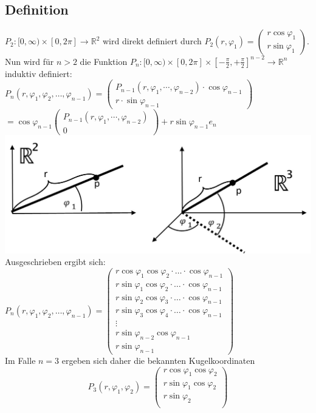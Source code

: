 \documentclass[a4paper,11pt]{scrartcl}
\newcommand{\R}{{\ensuremath{\mathbb{R}}}}
\begin{document}
\subsection{Definition}
$P_2:[0, \infty)\times [0, 2\pi]\to \R^2$ wird direkt definiert durch $P_2(r,\varphi_1)=\begin{pmatrix}
r\cos\varphi_1\\ r\sin\varphi_1\end{pmatrix}$.\\
Nun wird für $n>2$ die Funktion $P_n:[0,\infty)\times[0, 2\pi]\times[-\frac{\pi}{2},+\frac{\pi}{2}]^{n-2}\to \R^n$ induktiv definiert:\\[0.5em]
$P_n(r,\varphi_1, \varphi_2, \ldots, \varphi_{n-1})=\begin{pmatrix}
P_{n-1}(r,\varphi_1,\cdots,\varphi_{n-2})\cdot\cos\varphi_{n-1} \\ r\cdot\sin \varphi_{n-1}\end{pmatrix}
$ \\ $= \cos\varphi_{n-1}\begin{pmatrix}P_{n-1}(r,\varphi_1,\cdots,\varphi_{n-2}) \\ 0 \end{pmatrix}+r\sin\varphi_{n-1}e_n$\\
\includegraphics[scale=0.5]{images/PolarKugelkoordinaten.jpg}\\
Ausgeschrieben ergibt sich:\\
$P_n(r,\varphi_1, \varphi_2, \ldots, \varphi_{n-1})= \begin{pmatrix}r\cos\varphi_1\cos\varphi_2\cdot\ldots\cdot\cos\varphi_{n-1} \\ r\sin\varphi_1\cos\varphi_2\cdot\ldots\cdot\cos\varphi_{n-1} \\
r\sin\varphi_2\cos\varphi_3\cdot\ldots\cdot\cos\varphi_{n-1} \\
r\sin\varphi_3\cos\varphi_4\cdot\ldots\cdot\cos\varphi_{n-1} \\
\vdots \\
r\sin\varphi_{n-2}\cos\varphi_{n-1} \\
r \sin\varphi_{n-1}
\end{pmatrix}$\\
Im Falle $n=3$ ergeben sich daher die bekannten Kugelkoordinaten
$$P_3(r,\varphi_1, \varphi_2)=
\begin{pmatrix}r\cos\varphi_1\cos\varphi_2 \\
r\sin\varphi_1\cos\varphi_2\\
r\sin\varphi_2\\ \end{pmatrix}$$
\end{document}
